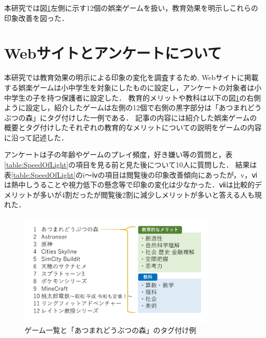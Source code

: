 \documentclass[twocolumn,10pt,a4j]{ltjsarticle}
\begin{document}
本研究では図\ref{fig:ゲーム一覧}左側に示す12個の娯楽ゲームを扱い，教育効果を明示しこれらの印象改善を図った．



\section{Webサイトとアンケートについて}
本研究では教育効果の明示による印象の変化を調査するため, Webサイトに掲載する娯楽ゲームは小中学生を対象にしたものに設定し，アンケートの対象者は小中学生の子を持つ保護者に設定した．
教育的メリットや教科は以下の図\ref{fig:ゲーム一覧}の右側ように設定し，紹介したゲームは左側の12個で右側の黒字部分は「あつまれどうぶつの森」にタグ付けした一例である．
記事の内容には紹介した娯楽ゲームの概要とタグ付けしたそれぞれの教育的なメリットについての説明をゲームの内容に沿って記述した．

アンケートは子の年齢やゲームのプレイ頻度，好き嫌い等の質問と，表\ref{table:SpeedOfLight}の項目を見る前と見た後について10人に質問した．
結果は表\ref{table:SpeedOfLight}のi～ⅳの項目は閲覧後の印象改善傾向にあったが，v，ⅵは熱中しうることや視力低下の懸念等で印象の変化は少なかった．ⅶは比較的デメリットが多いが4割だったが閲覧後2割に減少しメリットが多いと答える人も現れた．

\begin{figure}[h]
 \begin{center}
  \includegraphics[clip,width=95mm,height=55mm]{games.pdf}
 \end{center}
 \caption{ゲーム一覧と「あつまれどうぶつの森」のタグ付け例}
 \label{fig:ゲーム一覧}
\end{figure}
\end{document}
